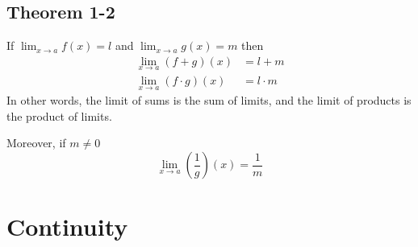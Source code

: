 \documentclass[10pt]{book}
\begin{document}
\section{Theorem 1-2}
If $\lim_{x \to a}f(x)=l$ and $\lim_{x \to a}g(x)=m$ then
\begin{align*}
  \lim_{x \to a}(f+g)(x)       & =l+m       \\
  \lim_{x \to a}(f \cdot g)(x) & =l \cdot m
\end{align*}
In other words, the limit of sums is the sum of limits, and the limit of products is the product of limits.

Moreover, if $m \ne 0$
\[
  \lim_{x \to a} \left(\dfrac{1}{g}\right)(x) = \dfrac{1}{m}
\]
\chapter{Continuity}



\end{document}
